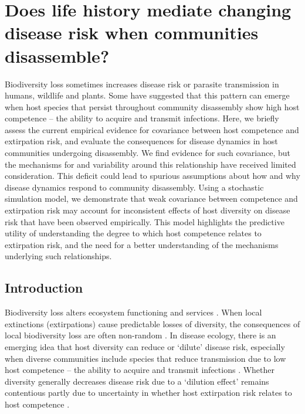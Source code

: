 \chapter{Does life history mediate changing disease risk when communities disassemble?}
\label{ch2}

Biodiversity loss sometimes increases disease risk or parasite transmission in humans, wildlife and plants. Some have suggested that this pattern can emerge when host species that persist throughout community disassembly show high host competence – the ability to acquire and transmit infections.
Here, we briefly assess the current empirical evidence for covariance between host competence and extirpation risk, and evaluate the consequences for disease dynamics in host communities undergoing disassembly. We find evidence for such covariance, but the mechanisms for and variability around this relationship have received limited consideration.
This deficit could lead to spurious assumptions about how and why disease dynamics respond to community disassembly.
Using a stochastic simulation model, we demonstrate that weak covariance between competence and extirpation risk may account for inconsistent effects of host diversity on disease risk that have been observed empirically.
This model highlights the predictive utility of understanding the degree to which host competence relates to extirpation risk, and the need for a better understanding of the mechanisms underlying such relationships.

\section{Introduction}

Biodiversity loss alters ecosystem functioning and services \citep{Cardinale2012}.
When local extinctions (extirpations) cause predictable losses of diversity, the consequences of local biodiversity loss are often non-random \citep{Henle2004, Cadotte2011}.
In disease ecology, there is an emerging idea that host diversity can reduce or ‘dilute’ disease risk, especially when diverse communities include species that reduce transmission due to low host competence – the ability to acquire and transmit infections \citep{Keesing2010}.
Whether diversity generally decreases disease risk due to a ‘dilution effect’ remains contentious partly due to uncertainty in whether host extirpation risk relates to host competence \citep{Randolph2012}.


